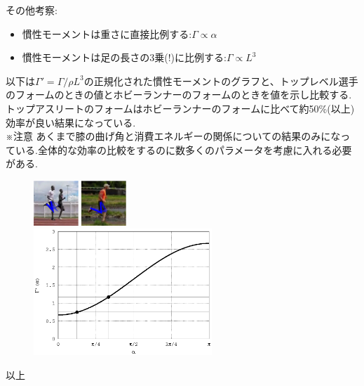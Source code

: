 \documentclass[11pt]{article}
\begin{document}
その他考察:
\begin{itemize}
\item 慣性モーメントは重さに直接比例する:$\Gamma\propto\alpha$
\item 慣性モーメントは足の長さの3乗(!)に比例する:$\Gamma\propto{}L^3$
\end{itemize}

\newpage

以下は$\Gamma'=\Gamma/\rho{}L^3$の正規化された慣性モーメントのグラフと、トップレベル選手のフォームのときの値とホビーランナーのフォームのときを値を示し比較する.\\
トップアスリートのフォームはホビーランナーのフォームに比べて約50\%(以上)効率が良い結果になっている.\\
{\tiny{ ※注意 あくまで膝の曲げ角と消費エネルギーの関係についての結果のみになっている.全体的な効率の比較をするのに数多くのパラメータを考慮に入れる必要がある.}}

\begin{figure}[h!]
\centering
\includegraphics[width=0.15\textwidth]{img/kenyan_form.eps}
\includegraphics[width=0.15\textwidth]{img/form.eps} \\
\includegraphics[width=0.6\textwidth]{plot.eps}
\end{figure}


\raggedleft 以上
\end{document}
